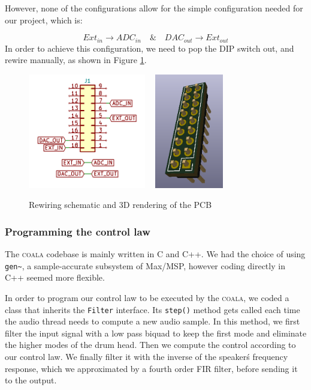 \documentclass[11pt, twocolumn]{article}
\begin{document}
However, none of the configurations allow for the simple configuration needed for our project, which is:

$$
\boxed{Ext_{in}} \longrightarrow \boxed{ADC_{in}}
\quad \& \quad
\boxed{DAC_{out}} \longrightarrow \boxed{Ext_{out}}
$$
In order to achieve this configuration, we need to pop the DIP switch out, and rewire manually, as shown in Figure \ref{fig:coala_rewire}.


\begin{figure}[!h]
    \centering
    \includegraphics[height=5cm]{coala_switch_fix.PNG}
    ~
    \includegraphics[height=5cm]{coala_switch_fix_render.PNG}
    \caption{Rewiring schematic and 3D rendering of the PCB}
    \label{fig:coala_rewire}
\end{figure}


\subsubsection{Programming the control law}

The \textsc{coala} codebase is mainly written in C and C++. We had the choice of using \texttt{gen\~}, a sample-accurate subsystem of Max/MSP, however coding directly in C++ seemed more flexible. 

In order to program our control law to be executed by the \textsc{coala}, we coded a class that inherits the \texttt{Filter} interface. Its \texttt{step()} method gets called each time the audio thread needs to compute a new audio sample. In this method, we first filter the input signal with a low pass biquad to keep the first mode and eliminate the higher modes of the drum head. Then we compute the control according to our control law. We finally filter it with the inverse of the speaker\'s frequency response, which we approximated by a fourth order FIR filter, before sending it to the output.
\end{document}
